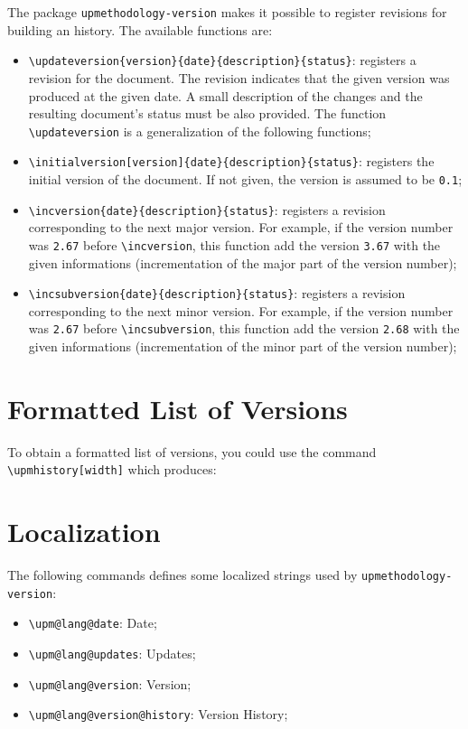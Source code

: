 \documentclass[book,taskpackage,specpackage,codepackage]{upmethodology-document}
\begin{document}
The package \texttt{upmethodology-version} makes it possible to register revisions for building an history. The available functions are:
\begin{itemize}
\item \texttt{{\textbackslash}updateversion\{version\}\{date\}\{description\}\{status\}}: registers a revision for the document. The revision indicates that the given version was produced at the given date. A small description of the changes and the resulting document's status must be also provided. The function \texttt{{\textbackslash}updateversion} is a generalization of the following functions;

\item \texttt{{\textbackslash}initialversion[version]\{date\}\{description\}\{status\}}: registers the initial version of the document. If not given, the version is assumed to be \texttt{0.1};

\item \texttt{{\textbackslash}incversion\{date\}\{description\}\{status\}}: registers a revision corresponding to the next major version. For example, if the version number was \texttt{2.67} before \texttt{{\textbackslash}incversion}, this function add the version \texttt{3.67} with the given informations (incrementation of the major part of the version number);

\item \texttt{{\textbackslash}incsubversion\{date\}\{description\}\{status\}}: registers a revision corresponding to the next minor version. For example, if the version number was \texttt{2.67} before \texttt{{\textbackslash}incsubversion}, this function add the version \texttt{2.68} with the given informations (incrementation of the minor part of the version number);
\end{itemize}

\section{Formatted List of Versions}

To obtain a formatted list of versions, you could use the command \texttt{{\textbackslash}upmhistory[width]} which produces:

\upmhistory

\section{Localization}

The following commands defines some localized strings used by \texttt{upmethodology-version}:
\begin{itemize}
\item \texttt{{\textbackslash}upm@lang@date}: Date;
\item \texttt{{\textbackslash}upm@lang@updates}: Updates;
\item \texttt{{\textbackslash}upm@lang@version}: Version;
\item \texttt{{\textbackslash}upm@lang@version@history}: Version History;
\end{itemize}
\end{document}
